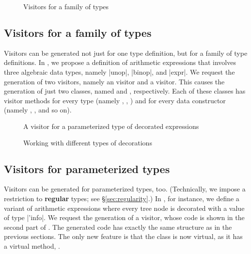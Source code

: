 \documentclass[onecolumn,11pt,nocopyrightspace]{sigplanconf}
\renewcommand{\emph}[1]{\textbf{#1}}
\begin{document}

\begin{figure}[t]
\caption{Visitors for a family of types}
\label{fig:expr06}
\end{figure}

\subsection{Visitors for a family of types}
\label{sec:intro:family}

Visitors can be generated not just for one type definition, but for a family
of type definitions. In , we propose a definition of
arithmetic expressions that involves three algebraic data types, namely
\oc|unop|, \oc|binop|, and \oc|expr|. We request the generation of two
visitors, namely an \iter visitor and a \map visitor. This causes the
generation of just two classes, named \iter and \map, respectively. Each of
these classes has visitor methods for every type (namely ,
, ) and for every data constructor
(namely , , and so on).


\begin{figure}[p]
\vspace{-\baselineskip}
\caption{A visitor for a parameterized type of decorated expressions}
\label{fig:expr09}
\end{figure}

\begin{figure}[p]
\caption{Working with different types of decorations}
\label{fig:expr10}
\end{figure}

\subsection{Visitors for parameterized types}
\label{sec:intro:parameterized}

Visitors can be generated for parameterized types, too. (Technically, we
impose a restriction to \emph{regular} types; see \S\ref{sec:regularity}.)
%
In , for instance, we define a variant of arithmetic
expressions where every tree node is decorated with a value of type
\oc|'info|. We request the generation of a \map visitor, whose code is shown
in the second part of . The generated code has exactly the
same structure as in the previous sections. The only new feature is that the
class \map is now virtual, as it has a virtual method, .
\end{document}
